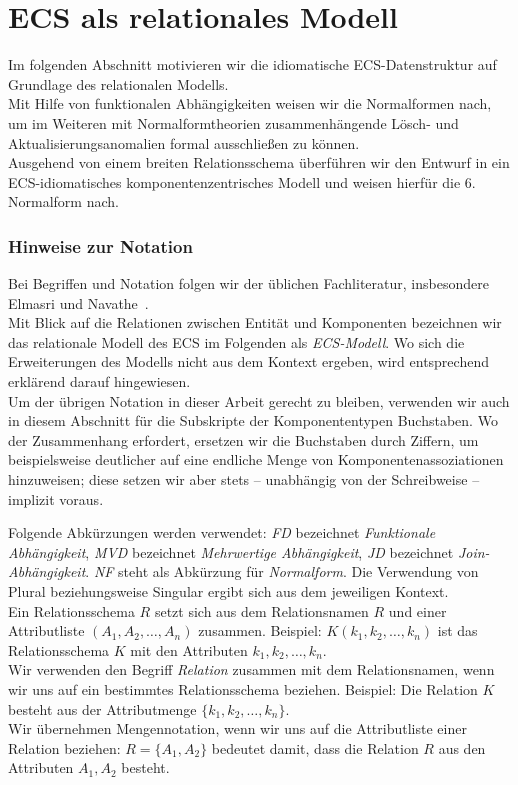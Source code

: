 \section{ECS als relationales Modell}


Im folgenden Abschnitt motivieren wir die idiomatische ECS-Datenstruktur auf Grundlage des relationalen Modells.\\
Mit Hilfe von funktionalen Abhängigkeiten weisen wir die Normalformen nach, um im Weiteren mit Normalformtheorien zusammenhängende Lösch- und Aktualisierungsanomalien formal ausschließen zu können.\\
Ausgehend von einem breiten Relationsschema überführen wir den Entwurf in ein ECS-idiomatisches komponentenzentrisches Modell und weisen hierfür die 6. Normalform nach.

\subsubsection*{Hinweise zur Notation}
Bei Begriffen und Notation folgen wir der üblichen Fachliteratur, insbesondere Elmasri und Navathe~\cite{EN11}.\\
Mit Blick auf die Relationen zwischen Entität und Komponenten bezeichnen wir das relationale Modell des ECS im Folgenden als \textit{ECS-Modell}.
Wo sich die Erweiterungen des Modells nicht aus dem Kontext ergeben, wird entsprechend erklärend darauf hingewiesen.\\
Um der übrigen Notation in dieser Arbeit gerecht zu bleiben, verwenden wir auch in diesem Abschnitt für die Subskripte der Komponententypen Buchstaben.
Wo der Zusammenhang erfordert, ersetzen wir die Buchstaben durch Ziffern, um beispielsweise deutlicher auf eine endliche Menge von Komponentenassoziationen hinzuweisen; diese setzen wir aber stets -- unabhängig von der Schreibweise -- implizit voraus.\\
\medskip

\noindent
Folgende Abkürzungen werden verwendet: \textit{FD} bezeichnet \textit{Funktionale Abhängigkeit}, \textit{MVD} bezeichnet \textit{Mehrwertige Abhängigkeit}, \textit{JD} bezeichnet
\textit{Join-Abhängigkeit}. \textit{NF} steht als Abkürzung für \textit{Normalform}.
Die Verwendung von Plural beziehungsweise Singular ergibt sich aus dem jeweiligen Kontext.\\

\noindent
Ein Relationsschema $R$ setzt sich aus dem Relationsnamen $R$ und einer Attributliste $(A_1, A_2, \ldots, A_n)$ zusammen.
Beispiel: $K(k_1, k_2, \ldots, k_n)$ ist das Relationsschema $K$ mit den Attributen $k_1, k_2, \ldots, k_n$.\\
Wir verwenden den Begriff \textit{Relation} zusammen mit dem Relationsnamen, wenn wir uns auf ein bestimmtes Relationsschema beziehen.
Beispiel: Die Relation $K$ besteht aus der Attributmenge $\{k_1, k_2, \ldots, k_n\}$.\\
Wir übernehmen Mengennotation, wenn wir uns auf die Attributliste einer Relation beziehen: $R = \{A_1, A_2\}$ bedeutet damit, dass die Relation $R$ aus den Attributen $A_1, A_2$ besteht.

